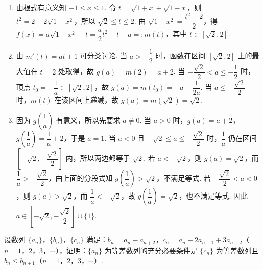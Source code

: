 \begin{solution}
\begin{enumerate}
\item 由根式有意义知 \(-1\leqslant x\leqslant1\). 令 \(t=\sqrt{1+x}+\sqrt{1-x}\)，则
\(t^2=2+2\sqrt{1-x^2}\)，所以 \(\sqrt2\leqslant t\leqslant2\). 由 \(\sqrt{1-x^2}=\dfrac{t^2-2}{2}\)，得
\(f(x)=a\sqrt{1-x^2}+t=\dfrac{a}{2}t^2+t-a=:m(t)\)，其中 \(t\in[\sqrt2,2]\).
\item
{}
由 \(m'(t)=at+1\) 可分类讨论. 当 \(a>-\dfrac12\) 时，函数在区间 \([\sqrt2,2]\) 上的最大值在 \(t=2\) 处取得，故 \(g(a)=m(2)=a+2\). 当 \(-\dfrac{\sqrt2}{2}<a\leqslant-\dfrac12\) 时，顶点 \(t_0=-\dfrac1a\in[\sqrt2,2]\)，故 \(g(a)=m(t_0)=-a-\dfrac1{2a}\). 当 \(a\leqslant-\dfrac{\sqrt2}{2}\) 时，\(m(t)\) 在该区间上递减，故 \(g(a)=m(\sqrt2)=\sqrt2\).
\item 因为 \(g\left(\dfrac1a\right)\) 有意义，所以先要求 \(a\neq0\). 当 \(a>0\) 时，\(g(a)=a+2\)，\(g\left(\dfrac1a\right)=\dfrac1a+2\)，于是 \(a=1\). 当 \(a<0\) 且 \(-\sqrt2\leqslant a\leqslant-\dfrac{\sqrt2}{2}\) 时，\(\dfrac1a\) 仍在区间 \(\left[-\sqrt2,-\dfrac{\sqrt2}{2}\right]\) 内，所以两边都等于 \(\sqrt2\). 若 \(a<-\sqrt2\)，则 \(g(a)=\sqrt2\)，而 \(\dfrac1a>-\dfrac{\sqrt2}{2}\)，由上面的分段式知 \(g\left(\dfrac1a\right)>\sqrt2\)，不满足等式. 若 \(-\dfrac{\sqrt2}{2}<a<0\)，则 \(g(a)>\sqrt2\)，而 \(\dfrac1a<-\sqrt2\)，故 \(g\left(\dfrac1a\right)=\sqrt2\)，也不满足等式. 因此 \(a\in\left[-\sqrt2,-\dfrac{\sqrt2}{2}\right]\cup\{1\}\).
\end{enumerate}
\end{solution}

\begin{problem}
设数列 \(\{a_{n}\}\)，\(\{b_{n}\}\)，\(\{c_{n}\}\) 满足：\(b_{n} = a_{n} - a_{n+2}\)，\(c_{n} = a_{n} + 2a_{n+1} + 3a_{n+2}\)（\(n = 1\)，\(2\)，\(3\)，\(\cdots\)），证明：\(\{a_{n}\}\) 为等差数列的充分必要条件是 \(\{c_{n}\}\) 为等差数列且 \(b_{n} \leqslant b_{n+1}\)（\(n = 1\)，\(2\)，\(3\)，\(\cdots\)）.
\end{problem}

